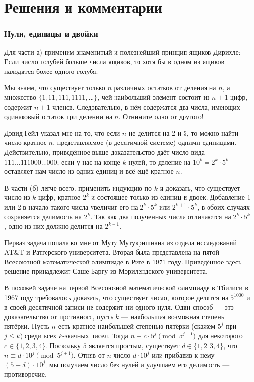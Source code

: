 \section*{Решения и комментарии}

\subsubsection*{Нули, единицы и двойки}%

Для части а) применим знаменитый и полезнейший принцип ящиков Дирихле:
Если число голубей больше числа ящиков, то хотя бы в одном из ящиков находится более одного голубя.

Мы знаем, что существует только $n$ различных остатков от деления на $n$, а множество $\{1, 11, 111, 1111,\dots\}$, чей наибольший элемент состоит из $n+1$ цифр, содержит $n+1$ членов.
Следовательно, в нём содержатся два числа, имеющих одинаковый остаток при делении на $n$.
Отнимите одно от другого!
\heart

Дэвид Гейл %
указал мне на то, %
что если $n$ не делится на 2 и 5, то можно найти число кратное $n$, представляемое (в десятичной системе) одними единицами.
Действительно, приведённое выше доказательство даёт число вида $111\dots111000\dots000$; 
если у нас на конце $k$ нулей, то деление на $10^k=2^k\cdot 5^k$ оставляет нам число из одних единиц и всё ещё кратное $n$.

\medskip

В части (б) легче всего, применить индукцию по $k$
и доказать, что существует число из $k$ цифр, кратное $2^k$ и состоящее только из единиц и двоек.
Добавление 1 или 2 в начало такого числа увеличит его на $2^k\cdot 5^k$ или $2^{k+1}\cdot 5^k$, в обоих случаях сохраняется делимость на $2^k$.
Так как два полученных числа отличаются на $2^k\cdot 5^k$, одно из них должно делится на $2^{k+1}$.
\heart

Первая задача попала ко мне от Муту Мутукришнана %
из отдела исследований AT\&T и Ратгерского университета.
Вторая была представлена на пятой Всесоюзной математической олимпиаде в Риге в 1971 году.
Приведённое здесь решение принадлежит Саше Баргу %
из Мэрилендского университета.

\medskip

В похожей задаче на первой Всесоюзной математической олимпиаде в Тбилиси в 1967 году требовалось доказать, что существует число, которое делится на $5^{1000}$ и в своей десятичной записи не содержит ни одного нуля.
Один способ --- это доказательство от противного, 
пусть $k$ --- наибольшая возможная степень пятёрки.
Пусть $n$ есть кратное наибольшей степенью пятёрки (скажем $5^j$ при $j\le k$)
среди всех $k$-значных чисел.
Тогда $n\equiv c\cdot 5^j\pmod{5^{j+1}}$ для некоторого $c\in\{1,2,3,4\}$.
Поскольку $5$ является простым, существует $d\in\{1,2,3,4\}$, что $n\equiv d\cdot 10^j\pmod{5^{j+1}}$.
Отняв от $n$ число $d\cdot 10^{j}$ или прибавив к нему $(5-d)\cdot 10^{j}$, мы получаем число без нулей и улучшаем его делимость --- противоречие.
\heart

